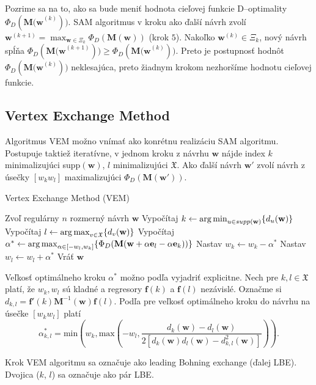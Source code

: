 Pozrime sa na to, ako sa bude meniť hodnota cieľovej funkcie D--optimality $\Phi_D(\mathbf{M(w}^{(k)}))$. SAM algoritmus v kroku ako ďalší návrh zvolí $\mathbf w^{(k+1)} = \max_{\mathbf w \in \Xi_k} \Phi_D(\mathbf{M(w)})$ (krok $5$).
Nakoľko $\mathbf w^{(k)} \in \Xi_k$, nový návrh spĺňa $\Phi_D(\mathbf {M(w}^{(k+1)})) \geq \Phi_D(\mathbf{M(w}^{(k)}))$. Preto je postupnosť hodnôt $\Phi_D(\mathbf{M(w}^{(k)}))$ neklesajúca, preto žiadnym krokom nezhoršíme hodnotu cieľovej funkcie.

\subsection{Vertex Exchange Method}

Algoritmus VEM možno vnímať ako konrétnu realizáciu SAM algoritmu. Postupuje taktiež iteratívne, v jednom kroku z návrhu $\mathbf w$ nájde index $k$ minimalizujúci supp$(\mathbf w)$, $l$ minimalizujúci $\mathfrak X$. Ako ďalší návrh $\mathbf {w'}$ zvolí návrh z úsečky $[w_kw_l]$ maximalizujúci $\Phi_D(\mathbf {M(w')})$.

\begin{algorithm}[H]
	\caption{Vertex Exchange Method (VEM) \cite{rex_harman}}
	\label{vem}
	\begin{algorithmic}[1]
		\State Zvoľ regulárny $n$ rozmerný návrh $\mathbf w$
			\State Vypočítaj $k \leftarrow \operatorname*{arg\,min}_{u \in supp(\mathbf w)} \{ d_u(\mathbf w)\}$
			\State Vypočítaj $l \leftarrow \operatorname*{arg\,max}_{v \in \mathfrak X} \{ d_v(\mathbf w)\}$
			\State Vypočítaj $\alpha^* \leftarrow \operatorname*{arg\,max}_{\alpha \in [-w_l, w_k]} \{ \Phi_D (\mathbf M(\mathbf w+\alpha \mathbf e_l -\alpha \mathbf e_k))\}$
			\State Nastav $w_k \leftarrow w_k - \alpha^*$
			\State Nastav $w_l \leftarrow w_l + \alpha^*$
		\EndWhile
		\State Vráť $\mathbf w$
	\end{algorithmic}
\end{algorithm}

Veľkosť optimálneho kroku $\alpha^*$  možno podľa \cite{rex_harman} vyjadriť explicitne. Nech pre $k, l \in \mathfrak X$ platí, že $w_k, w_l$ sú kladné a regresory $\mathbf f(k)$ a $\mathbf f(l)$ nezávislé. Označme si $d_{k,l}=\mathbf {f'}(k) \mathbf M^{-1}\mathbf{(w)f}(l)$. Podľa \cite{rex_harman} pre veľkosť optimálneho kroku do návrhu na úsečke $[w_kw_l]$ platí $$\alpha_{k,l}^*=\text{min} \left( w_k, \text{max} \left(-w_l, \frac{d_k(\mathbf w)-d_l(\mathbf w)}{2[d_k(\mathbf w)d_l(\mathbf w)-d_{k,l}^2(\mathbf w)]} \right) \right).$$

Krok VEM algoritmu sa označuje ako leading Bohning exchange (ďalej LBE). Dvojica ($k$, $l$) sa označuje ako pár LBE.